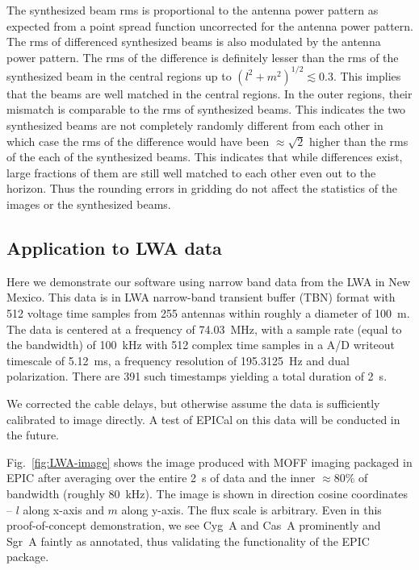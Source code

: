 \documentclass[a4paper,fleqn,usenatbib]{../mnras}
\begin{document}
The synthesized beam rms is proportional to the antenna power pattern as 
expected from a point spread function uncorrected for the antenna power 
pattern. The rms of differenced synthesized beams is 
also modulated by the antenna power pattern. The rms of the difference is 
definitely lesser than the rms of the synthesized beam in the central regions 
up to $(l^2+m^2)^{1/2}\lesssim 0.3$. This implies that the beams are well 
matched in the central regions. In the outer regions, their mismatch is 
comparable to the rms of synthesized beams. This indicates the two 
synthesized beams are not completely randomly different from each other in
which case the rms of the difference would have been $\approx \sqrt{2}$
higher than the rms of the each of the synthesized beams. This indicates 
that while differences exist, large fractions of them are still well matched
to each other even out to the horizon. Thus the rounding errors in gridding 
do not affect the statistics of the images or the synthesized beams.

\subsection{Application to LWA data}\label{sec:LWA-data}

Here we demonstrate our software using narrow band data from the LWA in New 
Mexico. This data is in LWA narrow-band transient buffer (TBN) format with 512 
voltage time samples from 255 antennas within roughly a diameter of 100~m. The 
data is centered at a frequency of 74.03~MHz, with a sample rate (equal to the 
bandwidth) of 100~kHz with 512 complex time samples in a A/D writeout timescale 
of 5.12~ms, a frequency resolution of 195.3125~Hz and dual polarization. There 
are 391 such timestamps yielding a total duration of 2~s. 

We corrected the cable delays, but otherwise assume the data is sufficiently 
calibrated to image directly. A test of EPICal on this data will be conducted 
in the future.

Fig.~\ref{fig:LWA-image} shows the image produced with MOFF imaging 
packaged in EPIC after averaging over the entire 2~s of data and the inner
$\approx 80$\% of bandwidth (roughly 80~kHz). The image is shown in direction 
cosine coordinates -- $l$ along x-axis and $m$ along y-axis. The flux scale 
is arbitrary. Even in this proof-of-concept demonstration, we see Cyg~A and 
Cas~A prominently and Sgr~A faintly as annotated, thus validating the 
functionality of the EPIC package.
\end{document}
